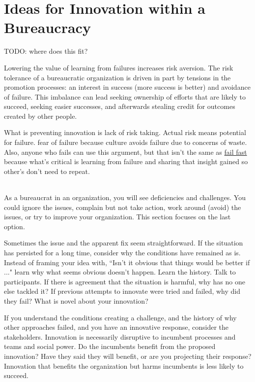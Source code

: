 \section{Ideas for Innovation within a Bureaucracy\label{sec:innovation}}

TODO: where does this fit?

Lowering the value of learning from failures increases risk aversion. The risk tolerance of a bureaucratic organization is driven in part by tensions in the promotion processes: an interest in success (more success is better) and avoidance of failure. This imbalance can lead seeking ownership of efforts that are likely to succeed, seeking easier successes, and afterwards stealing credit for outcomes created by other people. 

What is preventing innovation is lack of risk taking. Actual risk means potential for failure. fear of failure because culture avoids failure due to concerns of waste. Also, anyone who fails can use this argument, but that isn't the same as \href{https://en.wikipedia.org/wiki/Fail-fast#Business}{fail fast} 
because what's critical is learning from failure and sharing that insight gained so other's don't need to repeat. 


\ \\

As a bureaucrat in an organization, you will see deficiencies and challenges. You could ignore the issues, complain but not take action, work around (avoid) the issues, or try to improve your organization. This section focuses on the last option.

Sometimes the issue and the apparent fix seem straightforward. If the situation has persisted for a long time, consider why the conditions have remained as is. 
Instead of framing your idea with, ``Isn't it obvious that things would be better if ..." learn why what seems obvious doesn't happen. 
Learn the history. Talk to participants. If there is agreement that the situation is harmful, why has no one else tackled it? If previous attempts to innovate were tried and failed, why did they fail? What is novel about your innovation?

If you understand the conditions creating a challenge, and the history of why other approaches failed, and you have an innovative response, consider the stakeholders. 
Innovation is necessarily disruptive to incumbent processes and teams and social power. 
Do the incumbents benefit from the proposed innovation? Have they said they will benefit, or are you projecting their response? 
Innovation that benefits the organization but harms incumbents is less likely to succeed. 

